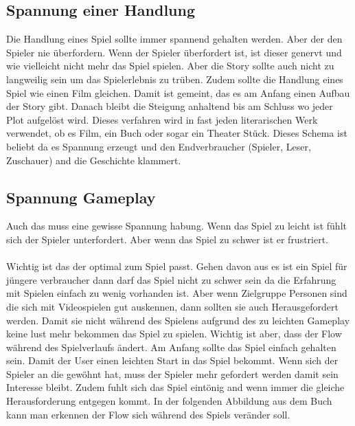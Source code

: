 \subsection{Spannung einer Handlung}
Die Handlung eines Spiel sollte immer spannend gehalten werden. Aber der den Spieler nie überfordern. Wenn der Spieler überfordert ist, ist dieser genervt und wie vielleicht nicht mehr das Spiel spielen. Aber die Story sollte auch nicht zu langweilig sein um das Spielerlebnis zu trüben. Zudem sollte die Handlung eines Spiel wie einen Film gleichen. Damit ist gemeint, das es am Anfang einen Aufbau der Story gibt. Danach bleibt die Steigung anhaltend bis am Schluss wo jeder Plot aufgelöst wird. Dieses verfahren wird in fast jeden literarischen Werk verwendet, ob es Film, ein Buch oder sogar ein Theater Stück. Dieses Schema ist beliebt da es Spannung erzeugt und den Endverbraucher (Spieler, Leser, Zuschauer) and die Geschichte klammert. 

\subsection{Spannung Gameplay}
Auch das  muss eine gewisse Spannung habung. Wenn das Spiel zu leicht ist fühlt sich der Spieler unterfordert. Aber wenn das Spiel zu schwer ist er frustriert.\\\\
Wichtig ist das der  optimal zum Spiel passt. Gehen davon aus es ist ein Spiel für jüngere verbraucher dann darf das Spiel nicht zu schwer sein da die Erfahrung mit Spielen einfach zu wenig vorhanden ist. Aber wenn Zielgruppe Personen sind die sich mit Videospielen gut auskennen, dann sollten sie auch Herausgefordert werden. Damit sie nicht während des Spielens aufgrund des zu leichten Gameplay keine lust mehr bekommen das Spiel zu spielen. Wichtig ist aber, dass der Flow während des Spielverlaufs ändert. Am Anfang sollte das Spiel einfach gehalten sein. Damit der User einen leichten Start in das Spiel bekommt. Wenn sich der Spieler an die  gewöhnt hat, muss der Spieler mehr gefordert werden damit sein Interesse bleibt. Zudem fuhlt sich das Spiel eintönig and wenn immer die gleiche Herausforderung entgegen kommt. In der folgenden Abbildung aus dem Buch  kann man erkennen der Flow sich während des Spiels veränder soll.

